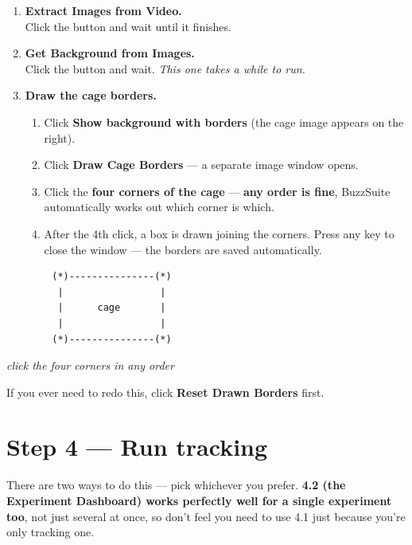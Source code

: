 \documentclass[11pt,a4paper]{article}
\begin{document}
\begin{enumerate}[leftmargin=*]
  \item \textbf{Extract Images from Video.}\\
        Click the button and wait until it finishes.

  \item \textbf{Get Background from Images.}\\
        Click the button and wait. \emph{This one takes a while to run.}

  \item \textbf{Draw the cage borders.}
  \begin{enumerate}[label=\alph*.]
    \item Click \textbf{Show background with borders} (the cage image appears on the right).
    \item Click \textbf{Draw Cage Borders} --- a separate image window opens.
    \item Click the \textbf{four corners of the cage} --- \textbf{any order is fine},
          BuzzSuite automatically works out which corner is which.
    \item After the 4th click, a box is drawn joining the corners. Press any key to close the
          window --- the borders are saved automatically.
  \end{enumerate}
\end{enumerate}

\begin{center}
\begin{verbatim}
        (*)---------------(*)
         |                 |
         |      cage       |
         |                 |
        (*)---------------(*)
\end{verbatim}
\textit{\small click the four corners in any order}
\end{center}

If you ever need to redo this, click \textbf{Reset Drawn Borders} first.

\section{Step 4 --- Run tracking}

There are two ways to do this --- pick whichever you prefer. \textbf{4.2 (the Experiment
Dashboard) works perfectly well for a single experiment too}, not just several at once, so
don't feel you need to use 4.1 just because you're only tracking one.
\end{document}
